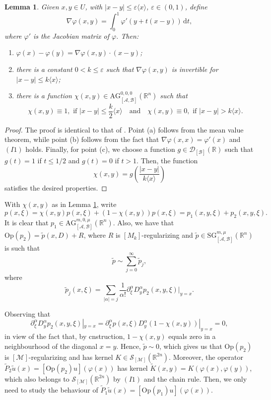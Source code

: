 \documentclass[11pt,reqno]{amsart}
\numberwithin{equation}{section}
\newtheorem{lemma}[theorem]{Lemma}
\newcommand{\R}{{\mathbb{R}}} %
\newcommand{\caS}{{\mathcal{S}}}
\newcommand{\SG}{{\mathrm{SG}}}
\newcommand{\AG}{{\mathrm{AG}}}
\newcommand{\M}{{\mathcal{M}}} %
\newcommand{\A}{{\mathcal{A}}} %
\newcommand{\B}{{\mathcal{B}}} %
\begin{document}
\begin{lemma}\label{lemma_M}
	Given $x,y\in U$, with $|x-y|\leq\varepsilon\langle x\rangle$, $\varepsilon\in(0,1)$,
	define 
	\[
		\nabla\varphi(x,y)=\int_0^1\varphi'(y+t(x-y))\,\mathrm{d}t,
	\]
	where $\varphi'$ is the Jacobian matrix of $\varphi$. Then:
	\begin{enumerate}
		\item[(a)] $\varphi(x)-\varphi(y)=\nabla\varphi(x,y)\cdot(x-y)$;
		
		\item[(b)] there is a constant $0<k\leq\varepsilon$ such that $\nabla\varphi(x,y)$ is invertible for $|x-y|\leq k\langle x\rangle$;
		
		\item[(c)] there is a function $\chi(x,y)\in \AG_{[\A,\B]}^{0,0,0}(\mathbb{R}^n)$ such that
		\[\chi(x,y)\equiv 1,\text{ if } |x-y|\leq \frac{k}{2}\langle x\rangle \quad \text{and} \quad  \chi(x,y)\equiv 0,\text{ if } |x-y|> k\langle x\rangle.\]
	\end{enumerate}
\end{lemma}
%
\begin{proof}
	The proof is identical to that of \cite[Lemma 2.4]{Schrohe86}. Point (a) follows from the mean value theorem, while point (b) follows from the fact that 
	$\nabla\varphi(x,x)=\varphi'(x)$ and $(I1)$ holds. Finally, for point (c), we choose a function $g\in\mathcal{D}_{[\B]}(\mathbb{R})$ such that $g(t)=1$ 
	if $t\leq 1/2$ and $g(t)=0$ if $t>1$. Then, the function 
	\[
		\chi(x,y) = g\left(\frac{|x-y|}{k\langle x\rangle}\right)
	\]
	satisfies the desired properties.
\end{proof}
%
With $\chi(x,y)$ as in Lemma \ref{lemma_M}, write
%
\[
	p(x,\xi)=\chi(x,y)p(x,\xi)+(1-\chi(x,y))p(x,\xi)=p_1(x,y,\xi)+p_2(x,y,\xi).
\]
%
It is clear that $p_1\in \AG_{[\A,\B]}^{m,0,\mu}(\mathbb{R}^n)$. Also, we have that $\mathrm{Op}(p_2)=\tilde{p}(x,D)+R$, 
where $R$ is $[M_k]$-regularizing and $\tilde{p}\in {\SG}_{[\A,\B]}^{m,\mu}(\R^n)$ is such that
%
\[\tilde{p}\sim \sum_{j=0}^\infty \tilde{p}_j,\]
%
where
%
\[\tilde{p}_j(x,\xi) = \sum_{|\alpha|=j}\frac{1}{\alpha!}\partial_\xi^\alpha D_y^\alpha p_2(x,y,\xi)|_{y=x}.\]

Observing that
%
\[\partial_\xi^\alpha D_y^\alpha p_2(x,y,\xi)|_{y=x} = \partial_\xi^\alpha p(x,\xi) D_y^\alpha (1-\chi(x,y))|_{y=x} = 0,\]
%
in view of the fact that, by cnstruction, $1-\chi(x,y)$ equals zero in a neighbourhood of the diagonal $x=y$. Hence, $\tilde{p}\sim 0$, which gives us that $\mathrm{Op}(p_2)$ is $[\M]$-regularizing and has kernel $K\in\caS_{[\M]}(\mathbb{R}^{2n})$. Moreover, the operator $\tilde{P}_2\tilde{u}(x)=[\mathrm{Op}(p_2)u](\varphi(x))$ has kernel $\tilde{K}(x,y)=K(\varphi(x),\varphi(y))$, which also belongs to $\caS_{[\M]}(\mathbb{R}^{2n})$ by $(I1)$ and the chain rule. Then, we only need to study the behaviour of $\tilde{P}_1\tilde{u}(x)=[\mathrm{Op}(p_1)u](\varphi(x))$.
\end{document}
